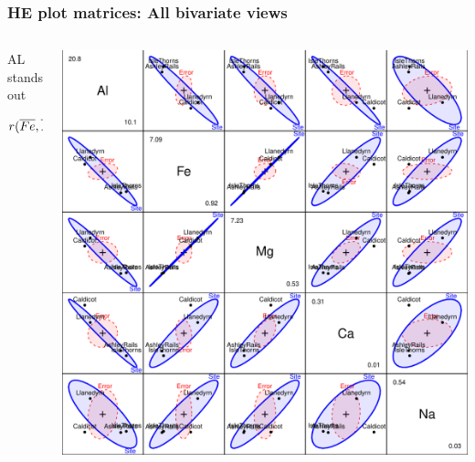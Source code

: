 \begin{frame}
	\frametitle{HE plot matrices: All bivariate views}
  \begin{columns}[c]
    \begin{column}{.25\textwidth}
	  AL stands out 

	  $r(\overline{Fe}, \overline{Mg}) \approx 1$

    \end{column}
    \begin{column}{.75\textwidth}
		\begin{center}
	      \includegraphics[height=.75\textheight,clip]{figures/pottery-HE3}
		  \\
		\end{center}
    \end{column}
  \end{columns}
\end{frame}
